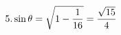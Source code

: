\documentclass[preview]{standalone}
\begin{document}
\begin{align*}
\special{dvisvgm:raw <g id='unique000'>}5. \sin\theta=\sqrt{1-\frac{1}{16}}=\frac{\sqrt{15}}{4}\special{dvisvgm:raw </g>}
\end{align*}
\end{document}
